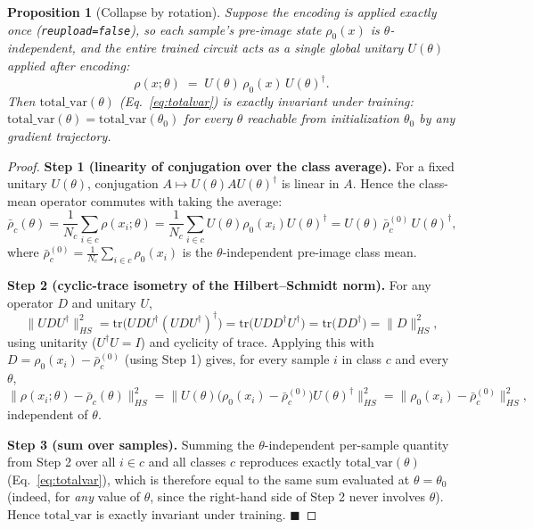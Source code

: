 \documentclass[pdflatex,sn-mathphys-ay]{sn-jnl}
\theoremstyle{thmstyleone}
\newtheorem{proposition}[theorem]{Proposition}
\theoremstyle{thmstyletwo}
\begin{document}
\begin{proposition}[Collapse by rotation]
\label{prop:rotation}
Suppose the encoding is applied exactly once (\texttt{reupload=false}), so each sample's pre-image state $\rho_0(x)$ is $\theta$-independent, and the entire trained circuit acts as a single global unitary $U(\theta)$ applied after encoding:
\begin{equation}
\rho(x;\theta) \;=\; U(\theta)\, \rho_0(x)\, U(\theta)^\dagger .
\label{eq:rotation}
\end{equation}
Then $\mathrm{total\_var}(\theta)$ (Eq.~\ref{eq:totalvar}) is exactly invariant under training: $\mathrm{total\_var}(\theta) = \mathrm{total\_var}(\theta_0)$ for every $\theta$ reachable from initialization $\theta_0$ by any gradient trajectory.
\end{proposition}
\begin{proof}
\textbf{Step 1 (linearity of conjugation over the class average).} For a fixed unitary $U(\theta)$, conjugation $A \mapsto U(\theta) A U(\theta)^\dagger$ is linear in $A$. Hence the class-mean operator commutes with taking the average:
\[
\bar\rho_c(\theta) = \frac{1}{N_c}\sum_{i\in c}\rho(x_i;\theta) = \frac{1}{N_c}\sum_{i\in c} U(\theta)\rho_0(x_i)U(\theta)^\dagger = U(\theta)\,\bar\rho_c^{(0)}\,U(\theta)^\dagger,
\]
where $\bar\rho_c^{(0)} = \frac{1}{N_c}\sum_{i\in c}\rho_0(x_i)$ is the $\theta$-independent pre-image class mean.

\textbf{Step 2 (cyclic-trace isometry of the Hilbert--Schmidt norm).} For any operator $D$ and unitary $U$,
\[
\|UDU^\dagger\|_{HS}^2 = \mathrm{tr}\!\big(UDU^\dagger (UDU^\dagger)^\dagger\big) = \mathrm{tr}\!\big(U D D^\dagger U^\dagger\big) = \mathrm{tr}\!\big(D D^\dagger\big) = \|D\|_{HS}^2,
\]
using unitarity ($U^\dagger U = I$) and cyclicity of trace. Applying this with $D = \rho_0(x_i) - \bar\rho_c^{(0)}$ (using Step 1) gives, for every sample $i$ in class $c$ and every $\theta$,
\[
\big\|\rho(x_i;\theta) - \bar\rho_c(\theta)\big\|_{HS}^2 = \big\|U(\theta)\big(\rho_0(x_i)-\bar\rho_c^{(0)}\big)U(\theta)^\dagger\big\|_{HS}^2 = \big\|\rho_0(x_i)-\bar\rho_c^{(0)}\big\|_{HS}^2,
\]
independent of $\theta$.

\textbf{Step 3 (sum over samples).} Summing the $\theta$-independent per-sample quantity from Step 2 over all $i\in c$ and all classes $c$ reproduces exactly $\mathrm{total\_var}(\theta)$ (Eq.~\ref{eq:totalvar}), which is therefore equal to the same sum evaluated at $\theta = \theta_0$ (indeed, for \emph{any} value of $\theta$, since the right-hand side of Step 2 never involves $\theta$). Hence $\mathrm{total\_var}$ is exactly invariant under training. $\blacksquare$
\end{proof}
\end{document}
